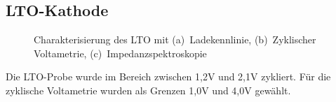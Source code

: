 \documentclass[a4paper, 11pt, headsepline,footsepline,twoside,abstract]{scrbook}
\begin{document}
\subsection{LTO-Kathode}
\begin{figure}
   \centering
       \vspace{3mm}
       \vspace{3mm}
       \vspace{3mm}
	\caption{Charakterisierung des LTO mit (a)~Ladekennlinie, (b)~Zyklischer Voltametrie, (c)~Impedanzspektroskopie}
   	\label{ec_LTO}
\end{figure}
Die LTO-Probe wurde im Bereich zwischen 1,2V und 2,1V zykliert. Für die zyklische Voltametrie wurden als Grenzen 1,0V und 4,0V gewählt.
\end{document}
